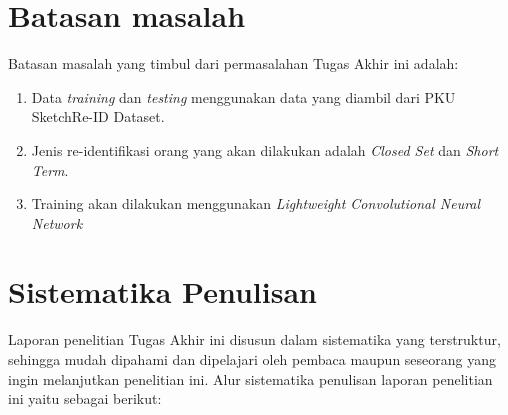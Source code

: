 \vspace{1ex}

\section{Batasan masalah}
\vspace{1ex}
Batasan masalah yang timbul dari permasalahan Tugas Akhir ini adalah:
\vspace{1ex}
\begin{enumerate}
	\vspace{-2mm}
	\item Data \textit{training} dan \textit{testing} menggunakan data yang diambil dari PKU SketchRe-ID Dataset.
	\vspace{-2mm}
	\item Jenis re-identifikasi orang yang akan dilakukan adalah \textit{Closed Set} dan \textit{Short Term}.
	\vspace{-2mm}
	\item Training akan dilakukan menggunakan \textit{Lightweight Convolutional Neural Network}
\end{enumerate}
\vspace{1ex}

\section{Sistematika Penulisan}
\vspace{1ex}
Laporan penelitian Tugas Akhir ini disusun dalam sistematika yang terstruktur, sehingga mudah dipahami dan dipelajari oleh pembaca maupun seseorang yang ingin melanjutkan penelitian ini. Alur sistematika penulisan laporan penelitian ini yaitu sebagai berikut:
\vspace{1ex}

